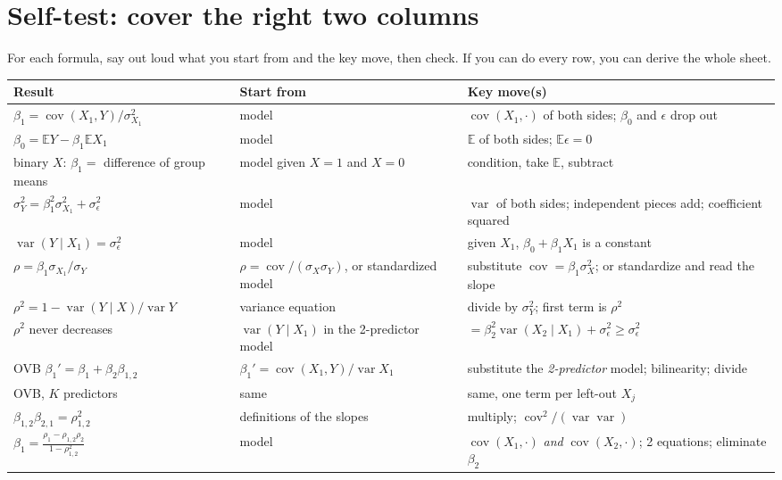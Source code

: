 \documentclass[11pt]{article}
\newcommand{\E}{\mathbb{E}}
\newcommand{\Var}{\operatorname{var}}
\newcommand{\Cov}{\operatorname{cov}}
\newcommand{\given}{\mid}
\begin{document}
\clearpage
\section{Self-test: cover the right two columns}\label{sec:selftest}
For each formula, say out loud what you start from and the key move, then check. If you can do every row, you can derive the whole sheet.
{\small
\renewcommand{\arraystretch}{1.28}
\begin{longtable}{@{}>{\raggedright\arraybackslash}p{4.6cm}>{\raggedright\arraybackslash}p{4.4cm}>{\raggedright\arraybackslash}p{6.6cm}@{}}
\toprule
\textbf{Result} & \textbf{Start from} & \textbf{Key move(s)}\\
\midrule
\endhead
$\beta_1=\Cov(X_1,Y)/\sigma_{X_1}^2$ & model & $\Cov(X_1,\cdot)$ of both sides; $\beta_0$ and $\epsilon$ drop out\\
$\beta_0=\E Y-\beta_1\E X_1$ & model & $\E$ of both sides; $\E\epsilon=0$\\
binary $X$: $\beta_1=$ difference of group means & model given $X=1$ and $X=0$ & condition, take $\E$, subtract\\
$\sigma_Y^2=\beta_1^2\sigma_{X_1}^2+\sigma_\epsilon^2$ & model & $\Var$ of both sides; independent pieces add; coefficient squared\\
$\Var(Y\given X_1)=\sigma_\epsilon^2$ & model & given $X_1$, $\beta_0+\beta_1X_1$ is a constant\\
$\rho=\beta_1\sigma_{X_1}/\sigma_Y$ & $\rho=\Cov/(\sigma_X\sigma_Y)$, or standardized model & substitute $\Cov=\beta_1\sigma_X^2$; or standardize and read the slope\\
$\rho^2=1-\Var(Y\given X)/\Var Y$ & variance equation & divide by $\sigma_Y^2$; first term is $\rho^2$\\
$\rho^2$ never decreases & $\Var(Y\given X_1)$ in the 2-predictor model & $=\beta_2^2\Var(X_2\given X_1)+\sigma_\epsilon^2\ge\sigma_\epsilon^2$\\
OVB $\beta_1'=\beta_1+\beta_2\beta_{1,2}$ & $\beta_1'=\Cov(X_1,Y)/\Var X_1$ & substitute the \emph{2-predictor} model; bilinearity; divide\\
OVB, $K$ predictors & same & same, one term per left-out $X_j$\\
$\beta_{1,2}\beta_{2,1}=\rho_{1,2}^2$ & definitions of the slopes & multiply; $\Cov^2/(\Var\Var)$\\
$\beta_1=\frac{\rho_1-\rho_{1,2}\rho_2}{1-\rho_{1,2}^2}$ & model & $\Cov(X_1,\cdot)$ \emph{and} $\Cov(X_2,\cdot)$; 2 equations; eliminate $\beta_2$\\

\end{longtable}}
\end{document}
